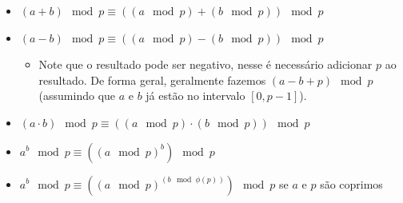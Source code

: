 \begin{itemize}
  \item $(a + b) \mod p \equiv ((a \mod p) + (b \mod p)) \mod p$
  \item $(a - b) \mod p \equiv ((a \mod p) - (b \mod p)) \mod p$
  \begin{itemize}
    \item Note que o resultado pode ser negativo, nesse é necessário adicionar $p$ ao resultado. De forma geral, geralmente fazemos $(a - b + p) \mod p$ (assumindo que $a$ e $b$ já estão no intervalo $[0, p-1]$).
  \end{itemize}
  \item $(a \cdot b) \mod p \equiv ((a \mod p) \cdot (b \mod p)) \mod p$
  \item $a^b \mod p \equiv ((a \mod p)^b) \mod p$
  \item $a^b \mod p \equiv ((a \mod p)^{(b \mod \phi(p))}) \mod p$ se $a$ e $p$ são coprimos
\end{itemize}
